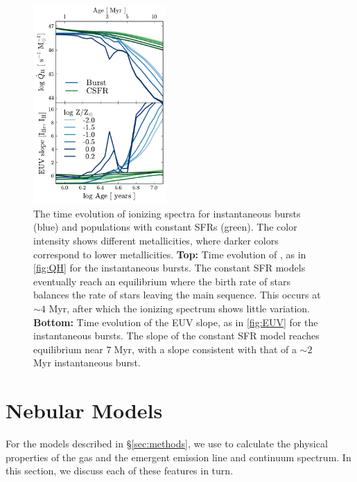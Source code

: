 \begin{figure}[!htbp]
  \begin{centering}
    \includegraphics[width=0.45\textwidth]{manuscript/chapter2/f4.pdf}
    \caption{The time evolution of ionizing spectra for instantaneous bursts (blue) and populations with constant SFRs (green). The color intensity shows different metallicities, where darker colors correspond to lower metallicities. \textbf{Top:} Time evolution of \QHat{}, as in \ref{fig:QH} for the instantaneous bursts. The constant SFR models eventually reach an equilibrium where the birth rate of stars balances the rate of stars leaving the main sequence. This occurs at ${\sim}4$ Myr, after which the ionizing spectrum shows little variation. \textbf{Bottom: } Time evolution of the EUV slope, as in \ref{fig:EUV} for the instantaneous bursts. The slope of the constant SFR model reaches equilibrium near $7\;$Myr, with a slope consistent with that of a ${\sim}2\;$Myr instantaneous burst.}
    \label{fig:CSFHQ}
  \end{centering}
\end{figure}

\section{Nebular Models}\label{sec:models}

For the models described in \S\ref{sec:methods}, we use \Cloudy to calculate the physical properties of the gas and the emergent emission line and continuum spectrum. In this section, we discuss each of these features in turn.

